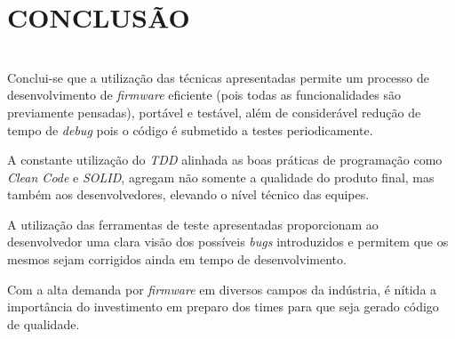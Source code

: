 \documentclass[times, twoside, watermark]{artigo}
\begin{document}

\section{CONCLUSÃO}\hfill\\
Conclui-se que a utilização das técnicas apresentadas permite um processo de
desenvolvimento de \textit{firmware} eficiente (pois todas as funcionalidades são
previamente pensadas), portável e testável, além de considerável redução de tempo de
\textit{debug} pois o código é submetido a testes periodicamente.

A constante utilização do \textit{TDD} alinhada as boas práticas de programação
como \textit{Clean Code} e \textit{SOLID}, agregam não somente a qualidade
do produto final, mas também aos desenvolvedores, elevando o nível técnico 
das equipes.

A utilização das ferramentas de teste apresentadas proporcionam ao desenvolvedor
uma clara visão dos possíveis \textit{bugs} introduzidos e permitem que os mesmos
sejam corrigidos ainda em tempo de desenvolvimento.

Com a alta demanda por \textit{firmware} em diversos campos da indústria, é nítida
a importância do investimento em preparo dos times para que seja gerado código 
de qualidade.



\end{document}
